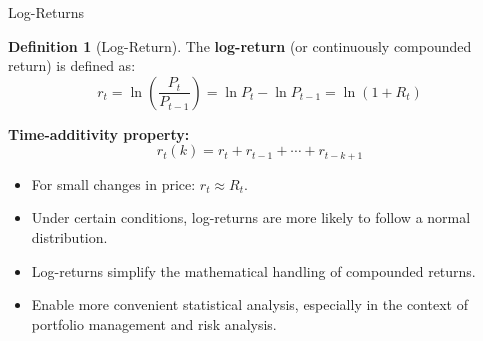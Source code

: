 \documentclass[9pt, aspectratio=169, t]{beamer}
\theoremstyle{definition}
\newtheorem{defn}{Definition}
\begin{document}
\begin{frame}{Log-Returns}

\begin{defn}[Log-Return]
The \textbf{log-return} (or continuously compounded return) is defined as:
\[
r_t = \ln\left(\frac{P_t}{P_{t-1}}\right) = \ln P_t - \ln P_{t-1} = \ln(1 + R_t)
\]
\end{defn}

\vspace{0.3cm}

\textbf{Time-additivity property:}
\[
r_t(k) = r_t + r_{t-1} + \cdots + r_{t-k+1}
\]

\vspace{0.3cm}

\begin{itemize}
    \item For small changes in price: $r_t \approx R_t$.
    \item Under certain conditions, log-returns are more likely to follow a normal distribution.
    \item Log-returns simplify the mathematical handling of compounded returns.
    \item Enable more convenient statistical analysis, especially in the context of portfolio management and risk analysis.
\end{itemize}

\end{frame}
\end{document}
